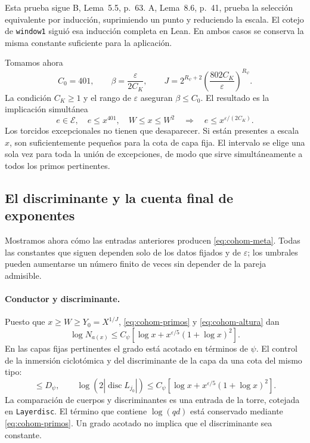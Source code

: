Esta prueba sigue B, Lema~5.5, p.~63.
A, Lema~8.6, p.~41, prueba la selección equivalente
por inducción, suprimiendo un punto y reduciendo la
escala. El cotejo de \texttt{window1} siguió esa
inducción completa en Lean.
En ambos casos se conserva la misma constante suficiente
para la aplicación.

Tomamos ahora
\begin{equation}
 C_0=401,\qquad
 \beta=\frac{\varepsilon}{2C_K},\qquad
 J=2^{R_\psi+2}
       \left(\frac{802C_K}{\varepsilon}\right)^{R_\psi}.
 \label{eq:cohom-eleccion-j}
\end{equation}
La condición $C_K\ge1$ y el rango de $\varepsilon$
aseguran $\beta\le C_0$.
El resultado es la implicación simultánea
\begin{equation}
 e\in\mathcal E,\quad e\le x^{401},\quad W\le x\le W^2
 \quad\Longrightarrow\quad
 e\le x^{\varepsilon/(2C_K)}.
 \label{eq:cohom-torcido-pequeno}
\end{equation}
Los torcidos excepcionales no tienen que desaparecer.
Si están presentes a escala $x$, son suficientemente
pequeños para la cota de capa fija.
El intervalo se elige una sola vez para toda la unión
de excepciones, de modo que sirve simultáneamente
a todos los primos pertinentes.

\subsection{El discriminante y la cuenta final de exponentes}

Mostramos ahora cómo las entradas anteriores producen
\eqref{eq:cohom-meta}. Todas las constantes que siguen
dependen solo de los datos fijados y de $\varepsilon$;
los umbrales pueden aumentarse un número finito de veces
sin depender de la pareja admisible.

\paragraph{Conductor y discriminante.}
Puesto que $x\ge W\ge Y_0=X^{1/J}$,
\eqref{eq:cohom-primos} y \eqref{eq:cohom-altura} dan
\begin{equation}
 \log N_{a(x)}
 \le C_\psi\left[\log x+
              x^{\varepsilon/5}(1+\log x)^2\right].
 \label{eq:cohom-conductor}
\end{equation}
En las capas fijas pertinentes el grado está acotado
en términos de $\psi$.
El control de la inmersión ciclotómica y del
discriminante de la capa da una cota del mismo tipo:
\begin{equation}
 [L_{j_0}:\Q]\le D_\psi,\qquad
 \log(2|\operatorname{disc}L_{j_0}|)
 \le C_\psi\left[\log x+
              x^{\varepsilon/5}(1+\log x)^2\right].
 \label{eq:cohom-discriminante}
\end{equation}
La comparación de cuerpos y discriminantes es una entrada
de la torre, cotejada en \texttt{Layerdisc}.
El término que contiene $\log(qd)$ está conservado
mediante \eqref{eq:cohom-primos}.
Un grado acotado no implica que el discriminante
sea constante.

